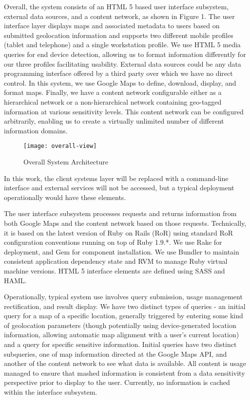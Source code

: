 Overall, the system consists of an HTML 5 based user interface subsystem, external data sources, and a content network, as shown in Figure 1.  The user interface layer displays maps and associated metadata to users based on submitted geolocation information and supports two different mobile profiles (tablet and telephone) and a single workstation profile.  We use HTML 5 media queries for end device detection, allowing us to format information differently for our three profiles facilitating usability.  External data sources could be any data programming interface offered by a third party over which we have no direct control.  In this system, we use Google Maps to define, download, display, and format maps.  Finally, we have a content network configurable either as a hierarchical network or a non-hierarchical network containing geo-tagged information at various sensitivity levels.  This content network can be configured arbitrarily, enabling us to create a virtually unlimited number of different information domains.

\begin{figure}[!t]
\centering
\texttt{[image: overall-view]}
\caption{Overall System Architecture}
\label{fig:model:overall-view}
\end{figure}

In this work, the client systems layer will be replaced with a command-line interface and external services will not be accessed, but a typical deployment operationally would have these elements.

The user interface subsystem processes requests and returns information from both Google Maps and the content network based on those requests.  Technically, it is based on the latest version of Ruby on Rails (RoR) using standard RoR configuration conventions running on top of Ruby 1.9.*.  We use Rake for deployment, and Gem for component installation.  We use Bundler to maintain consistent application dependency state and RVM to manage Ruby virtual machine versions.  HTML 5 interface elements are defined using SASS and HAML.

Operationally, typical system use involves query submission, usage management rectification,  and result display.  We have two distinct types of queries - an initial query for a map of a specific location, generally triggered by entering some kind of geolocation parameters (though potentially using device-generated location information, allowing automatic map alignment with a user's current location) and a query for specific sensitive information.  Initial queries have two distinct subqueries, one of map information directed at the Google Maps API, and another of the content network to see what data is available.  All content is usage managed to ensure that mashed information is consistent from a data sensitivity perspective prior to display to the user.  Currently, no information is cached within the interface subsystem.

